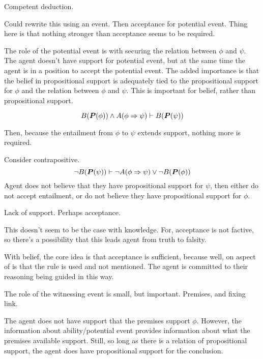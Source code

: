 {\begin{note}
    Competent deduction.

    Could rewrite this using an event.
    Then acceptance for potential event.
    Thing here is that nothing stronger than acceptance seems to be required.
    

    The role of the potential event is with securing the relation between \(\phi\) and \(\psi\).
    The agent doesn't have support for potential event, but at the same time the agent is in a position to accept the potential event.
    The added importance is that the belief in propositional support is adequately tied to the propositional support for \(\phi\) and the relation between \(\phi\) and \(\psi\).
    This is important for belief, rather than propositional support.

    \[B(\bm{P}(\phi)) \land A(\phi \Rightarrow{} \psi) \vdash B(\bm{P}(\psi))\]

    Then, because the entailment from \(\phi\) to \(\psi\) extends support, nothing more is required.

    Consider contrapositive.
    \[\lnot B(\bm{P}(\psi)) \vdash  \lnot A(\phi \Rightarrow{} \psi) \lor \lnot B(\bm{P}(\phi))\]
    Agent does not believe that they have propositional support for \(\psi\), then either do not accept entailment, or do not believe they have propositional support for \(\phi\).
    

    Lack of support.
    Perhaps acceptance.
  \end{note}

  \begin{note}
    This doesn't seem to be the case with knowledge.
    For, acceptance is not factive, so there's a possibility that this leads agent from truth to falsity.

    With belief, the core idea is that acceptance is sufficient, because well, on aspect of \WR{} is that the rule is used and not mentioned.
    The agent is committed to their reasoning being guided in this way.
  \end{note}

  \begin{note}[\WR{}]
    The role of the witnessing event is small, but important.
    Premises, and fixing link.
  \end{note}

  \color{red}
  \begin{note}
    The agent does not have support that the premises support \(\phi\).
    However, the information about ability/potential event provides information about what the premises available support.
    Still, so long as there is a relation of propositional support, the agent does have propositional support for the conclusion.
  \end{note}
}

